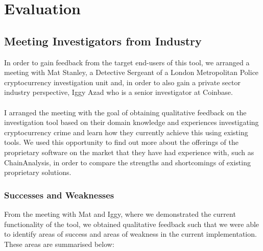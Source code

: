 \chapter{Evaluation}
\section{Meeting Investigators from Industry} 
In order to gain feedback from the target end-users of this tool, we arranged a meeting with Mat Stanley, a Detective Sergeant of a London Metropolitan Police cryptocurrency investigation unit and, in order to also gain a private sector industry perspective, Iggy Azad who is a senior investigator at Coinbase.
\\\\
I arranged the meeting with the goal of obtaining qualitative feedback on the investigation tool based on their domain knowledge and experiences investigating cryptocurrency crime and learn how they currently achieve this using existing tools. We used this opportunity to find out more about the offerings of the proprietary software on the market that they have had experience with, such as ChainAnalysis, in order to compare the strengths and shortcomings of existing proprietary solutions.

\subsection{Successes and Weaknesses}
From the meeting with Mat and Iggy, where we demonstrated the current functionality of the tool, we obtained qualitative feedback such that we were able to identify areas of success and areas of weakness in the current implementation. These areas are summarised below:

